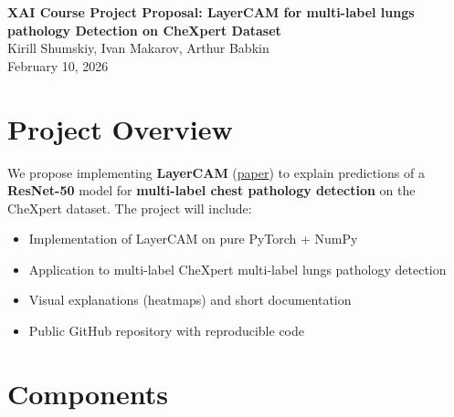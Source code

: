 \documentclass[12pt]{article}
\begin{document}
\begin{center}
    {\LARGE \textbf{XAI Course Project Proposal: LayerCAM for multi-label lungs pathology Detection on CheXpert Dataset}} \\[1.2em]
    {\large Kirill Shumskiy, Ivan Makarov, Arthur Babkin} \\[0.6em]
    {\large February 10, 2026}
\end{center}

\section{Project Overview}

We propose implementing \textbf{LayerCAM} (\href{https://www.researchgate.net/publication/352675569_LayerCAM_Exploring_Hierarchical_Class_Activation_Maps}{paper}) to explain predictions of a \textbf{ResNet-50} model for \textbf{multi-label chest pathology detection} on the CheXpert dataset. The project will include:
\begin{itemize}
    \item Implementation of LayerCAM on pure PyTorch + NumPy
    \item Application to multi-label CheXpert multi-label lungs pathology detection
    \item Visual explanations (heatmaps) and short documentation
    \item Public GitHub repository with reproducible code
\end{itemize}

\section{Components}
\end{document}
